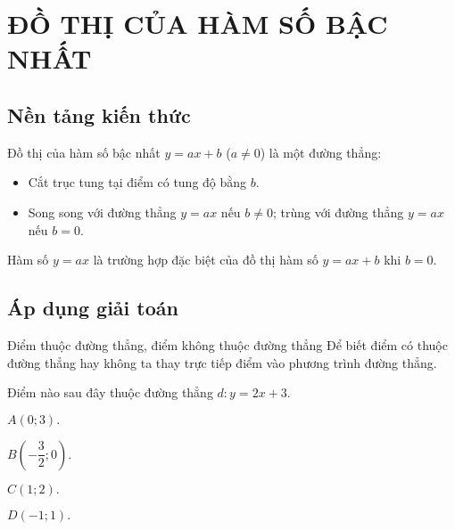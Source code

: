 
\section{ĐỒ THỊ CỦA HÀM SỐ BẬC NHẤT}

\subsection{Nền tảng kiến thức}
Đồ thị của hàm số bậc nhất $y=ax+b$ ($a\ne 0$) là một đường thẳng:
\begin{itemize}
	\item Cắt trục tung tại điểm có tung độ bằng $b$.
	\item Song song với đường thẳng $y=ax$ nếu $b\ne 0$; trùng với đường thẳng $y=ax$ nếu $b=0$.
\end{itemize}
Hàm số $y=ax$ là trường hợp đặc biệt của đồ thị hàm số $y=ax+b$ khi $b=0.$

\subsection{Áp dụng giải toán}

\begin{dang}{Điểm thuộc đường thẳng, điểm không thuộc đường thẳng}
	Để biết điểm có thuộc đường thẳng hay không ta thay trực tiếp điểm vào phương trình đường thẳng.
\end{dang}

\begin{vd}
	Điểm nào sau đây thuộc đường thẳng $d\colon y=2x+3.$
	\begin{enumEX}{2}
		\item $A(0;3).$
		\item $B(-\dfrac{3}{2};0).$
		\item $C(1;2).$
		\item $D(-1;1).$
	\end{enumEX}
\end{vd}

